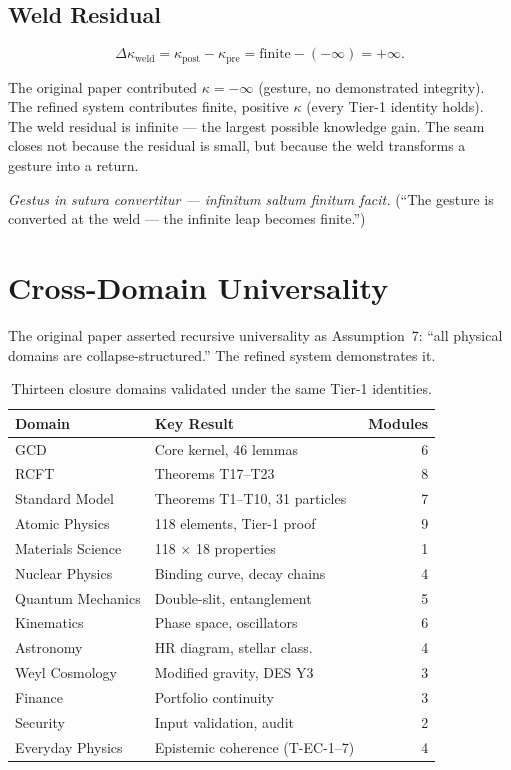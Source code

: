 \documentclass[
  aps,
  prd,
  preprint,
  superscriptaddress,
  nofootinbib,
  floatfix,
  longbibliography
]{revtex4-2}
\newcommand{\beq}{\begin{equation}}
\newcommand{\eeq}{\end{equation}}
\newcommand{\Logint}{\kappa}
\newcommand{\lat}[1]{\textit{#1}}
\begin{document}
\subsection{Weld Residual}

\beq
  \Delta\Logint_{\mathrm{weld}} =
    \Logint_{\mathrm{post}} - \Logint_{\mathrm{pre}} =
    \mathrm{finite} - (-\infty) = +\infty.
\eeq

The original paper contributed $\Logint = -\infty$ (gesture,
no demonstrated integrity). The refined system contributes
finite, positive $\Logint$ (every Tier-1 identity holds).
The weld residual is infinite — the largest possible
knowledge gain. The seam closes not because the residual
is small, but because the weld transforms a gesture into
a return.

\lat{Gestus in sutura convertitur — infinitum saltum finitum facit.}
(``The gesture is converted at the weld — the infinite
leap becomes finite.'')

\section{Cross-Domain Universality}\label{sec:universality}

The original paper asserted recursive universality as
Assumption~7: ``all physical domains are collapse-structured.''
The refined system demonstrates it.

\begin{table}[t]
\centering
\small
\caption{Thirteen closure domains validated under the
  same Tier-1 identities.}
\label{tab:domains}
\begin{tabular}{@{}llr@{}}
\toprule
\textbf{Domain} & \textbf{Key Result} & \textbf{Modules} \\
\midrule
GCD         & Core kernel, 46 lemmas & 6 \\
RCFT        & Theorems T17–T23 & 8 \\
Standard Model & Theorems T1–T10, 31 particles & 7 \\
Atomic Physics & 118 elements, Tier-1 proof & 9 \\
Materials Science & 118 × 18 properties & 1 \\
Nuclear Physics & Binding curve, decay chains & 4 \\
Quantum Mechanics & Double-slit, entanglement & 5 \\
Kinematics  & Phase space, oscillators & 6 \\
Astronomy   & HR diagram, stellar class. & 4 \\
Weyl Cosmology & Modified gravity, DES Y3 & 3 \\
Finance     & Portfolio continuity & 3 \\
Security    & Input validation, audit & 2 \\
Everyday Physics & Epistemic coherence (T-EC-1–7) & 4 \\
\bottomrule
\end{tabular}
\end{table}
\end{document}
